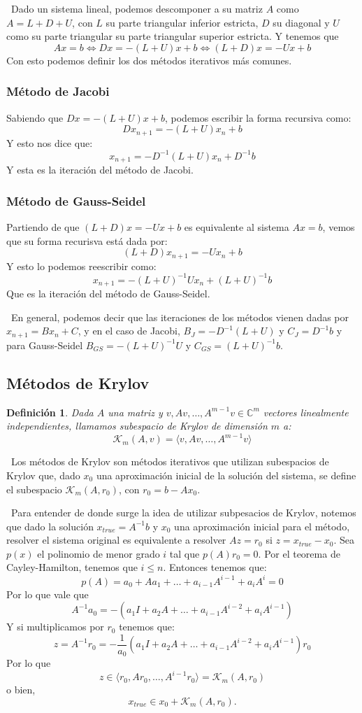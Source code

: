 \documentclass[12pt, oneside]{book}
\newtheorem*{definition}{Definición}
\begin{document}
\ Dado un sistema lineal, podemos descomponer a su matriz $A$ como $A=L+D+U$, con $L$ su parte triangular inferior estricta, $D$ su diagonal y $U$ como su parte triangular su parte triangular superior estricta. Y tenemos que $$Ax=b \iff Dx=-(L+U)x+b \iff (L+D)x=-Ux+b$$ Con esto podemos definir los dos métodos iterativos más comunes.
\subsubsection{Método de Jacobi}
Sabiendo que $Dx=-(L+U)x+b$, podemos escribir la forma recursiva como: $$Dx_{n+1}=-(L+U)x_n+b$$ Y esto nos dice que: $$x_{n+1}=-D^{-1}(L+U)x_n+D^{-1}b$$ Y esta es la iteración del método de Jacobi.
\subsubsection{Método de Gauss-Seidel}
Partiendo de que $(L+D)x=-Ux+b$ es equivalente al sistema $Ax=b$, vemos que su forma recurisva está dada por: $$(L+D)x_{n+1}=-Ux_n+b$$ Y esto lo podemos reescribir como: $$x_{n+1}=-(L+U)^{-1}Ux_n+(L+U)^{-1}b$$ Que es la iteración del método de Gauss-Seidel.

\ En general, podemos decir que las iteraciones de los métodos vienen dadas por $x_{n+1}=Bx_n+C$, y en el caso de Jacobi, $B_J=-D^{-1}(L+U)$ y $C_J=D^{-1}b$ y para Gauss-Seidel $B_{GS}=-(L+U)^{-1}U$ y $C_{GS}=(L+U)^{-1}b$.

\subsection{Métodos de Krylov}
\begin{definition}
	Dada $A$ una matriz y $v, Av, \dots , A^{m-1}v \in \mathbb{C}^m$ vectores linealmente independientes, llamamos subespacio de Krylov de dimensión $m$ a: $$\mathcal{K}_{m}(A, v) = \langle v, Av, \ldots, A^{m-1}v \rangle$$
\end{definition} 
\ Los métodos de Krylov son métodos iterativos que utilizan subespacios de Krylov que, dado $x_0$ una aproximación inicial de la solución del sistema, se define el subespacio $\mathcal{K}_{m}(A, r_0)$, con $r_0=b-Ax_0$.

\ Para entender de donde surge la idea de utilizar subpesacios de Krylov, notemos que dado la solución $x_{true}=A^{-1}b$ y $x_0$ una aproximación inicial para el método, resolver el sistema original es equivalente a resolver $Az=r_0$ si $z=x_{true}-x_0$. Sea $p(x)$ el polinomio de menor grado $i$ tal que $p(A)r_0=0$. Por el teorema de Cayley-Hamilton, tenemos que $i\leq n$. Entonces tenemos que: $$p(A)=a_0+Aa_1+\dots+a_{i-1}A^{i-1}+a_iA^i=0$$ Por lo que vale que $$A^{-1}a_0=-(a_1I+a_2A+\dots+a_{i-1}A^{i-2}+a_iA^{i-1})$$ Y si multiplicamos por $r_0$ tenemos que: $$z=A^{-1}r_0=-\frac{1}{a_0}(a_1I+a_2A+\dots+a_{i-1}A^{i-2}+a_iA^{i-1})r_0$$ Por lo que $$z\in \langle r_0,Ar_0,\dots,A^{i-1}r_0 \rangle = \mathcal{K}_{m}(A, r_0)$$ o bien, $$x_{true} \in x_0 + \mathcal{K}_{m}(A, r_0).$$
\end{document}
